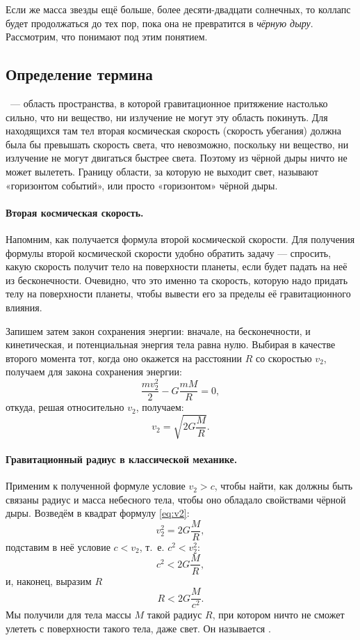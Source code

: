 \documentclass[a4paper, 12pt]{extarticle}
\newcommand{\define}[1]{\uwave{#1}}
\begin{document}
  Если же масса звезды ещё больше, более десяти-двадцати солнечных, то коллапс будет продолжаться до
  тех пор, пока она не превратится в \emph{чёрную дыру}. Рассмотрим, что понимают под этим понятием.

  \subsection{Определение термина}

  \define{Чёрная дыра}~--- область пространства, в которой гравитационное притяжение настолько
  сильно, что ни вещество, ни излучение не могут эту область покинуть. Для находящихся там тел
  вторая космическая скорость (скорость убегания) должна была бы превышать скорость света, что
  невозможно, поскольку ни вещество, ни излучение не могут двигаться быстрее света. Поэтому из
  чёрной дыры ничто не может вылететь. Границу области, за которую не выходит свет, называют
  «горизонтом событий», или просто «горизонтом» чёрной дыры.

  \paragraph{Вторая космическая скорость.} Напомним, как получается формула второй космической
  скорости. Для получения формулы второй космической скорости удобно обратить задачу — спросить,
  какую скорость получит тело на поверхности планеты, если будет падать на неё из бесконечности.
  Очевидно, что это именно та скорость, которую надо придать телу на поверхности планеты, чтобы
  вывести его за пределы её гравитационного влияния.

  Запишем затем закон сохранения энергии: вначале, на бесконечности, и кинетическая, и потенциальная
  энергия тела равна нулю. Выбирая в качестве второго момента тот, когда оно окажется на расстоянии
  $R$ со скоростью $v_2$, получаем для закона сохранения энергии:
    \[
      \frac{mv_2^2}{2} - G\frac{mM}{R} = 0,
    \]
  откуда, решая относительно $v_2$, получаем:
    \begin{equation}\label{eq:v2}
      v_2 = \sqrt{2G\frac{M}{R}}.
    \end{equation}

  \paragraph{Гравитационный радиус в классической механике.} Применим к полученной формуле условие
  $v_2 > c$, чтобы найти, как должны быть связаны радиус и масса небесного тела, чтобы оно обладало
  свойствами чёрной дыры. Возведём в квадрат формулу \eqref{eq:v2}:
    \[
      v_2^2 = 2G\frac{M}{R},
    \]
  подставим в неё условие $c < v_2$, т.~е. $c^2 < v_2^2$:
    \[
      c^2 < 2G\frac{M}{R},
    \]
  и, наконец, выразим $R$
    \[
      \boxed{
        R < 2G\frac{M}{c^2}.
      }
    \]
  Мы получили для тела массы $M$ такой радиус $R$, при котором ничто не сможет улететь с поверхности
  такого тела, даже свет. Он называется \define{гравитационным радиусом}.
\end{document}
